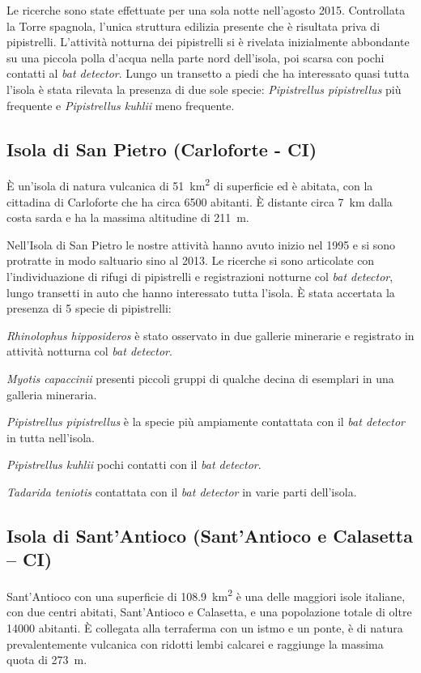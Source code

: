 \begin{multicols}{2}
\begin{compactdesc}
Le ricerche sono state effettuate per una sola notte nell’agosto 2015. Controllata la Torre spagnola, l’unica struttura edilizia presente che è risultata priva di pipistrelli.
L’attività notturna dei pipistrelli si è rivelata inizialmente abbondante su una piccola polla d’acqua nella parte nord dell’isola, poi scarsa con pochi contatti al \textit{bat detector}.
Lungo un transetto a piedi che ha interessato quasi tutta l’isola è stata rilevata la presenza di due sole specie: \emph{Pipistrellus pipistrellus} più frequente e \emph{Pipistrellus kuhlii} meno frequente. 

\subsection*{Isola di San Pietro (Carloforte - CI)}
È un’isola di natura vulcanica di \SI{51}{\square\kilo\meter} di superficie ed è abitata, con la cittadina di Carloforte che ha circa 6500 abitanti. È distante circa 7~km dalla costa sarda e ha la massima altitudine di 211~m.

Nell’Isola di San Pietro le nostre attività hanno avuto inizio nel 1995 e si sono protratte in modo saltuario sino al 2013. Le ricerche si sono articolate con l’individuazione di rifugi di pipistrelli e registrazioni notturne col \textit{bat detector}, lungo transetti in auto che hanno interessato tutta l’isola.
È stata accertata la presenza di 5 specie di pipistrelli: 
\begin{compactdesc}
\item[\emph{Rhinolophus hipposideros}] è stato osservato in due gallerie minerarie e registrato in attività notturna col \textit{bat detector}. 
\item[\emph{Myotis capaccinii}] presenti piccoli gruppi di qualche decina di esemplari in una galleria mineraria. 
\item[\emph{Pipistrellus pipistrellus}] è la specie più ampiamente contattata con il \textit{bat detector} in tutta nell’isola. 
\item[\emph{Pipistrellus kuhlii}] pochi contatti con il \textit{bat detector}. 
\item[\emph{Tadarida teniotis}] contattata con il \textit{bat detector} in varie parti dell’isola. 
\end{compactdesc}

\subsection*{Isola di Sant'Antioco (Sant'Antioco e Calasetta – CI)}
Sant'Antioco con una superficie di \SI{108.9}{\square\kilo\meter} è una delle maggiori isole italiane, con due centri abitati, Sant’Antioco e Calasetta, e una popolazione totale di oltre 14000 abitanti. È collegata alla terraferma con un istmo e un ponte, è di natura prevalentemente vulcanica con ridotti lembi calcarei e raggiunge la massima quota di 273~m.


\end{compactdesc}
\end{multicols}
